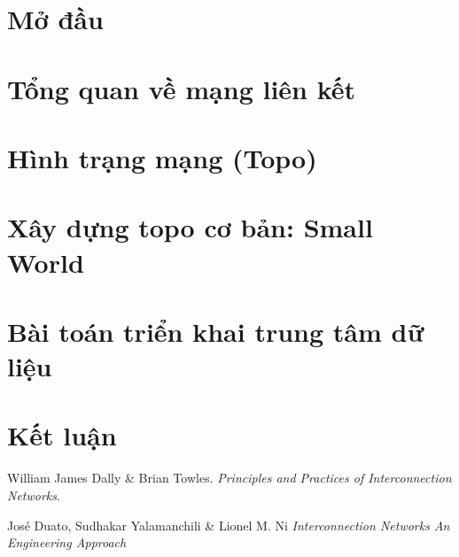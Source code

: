 \documentclass[12pt]{report}
\begin{document}


\tableofcontents 
\newpage

\newpage
\setcounter{page}{1}

\section{Mở đầu}


\section{Tổng quan về mạng liên kết}


\section{Hình trạng mạng (Topo)}


\section{Xây dựng topo cơ bản: Small World}


\section{Bài toán triển khai trung tâm dữ liệu}


\section{Kết luận}


\begin{thebibliography}{9}
	William James Dally \& Brian Towles.
	\textit{Principles and Practices of Interconnection Networks}. 

    José Duato, Sudhakar Yalamanchili \& Lionel M. Ni
    \textit{Interconnection Networks An Engineering Approach}
\end{thebibliography}
\end{document}
